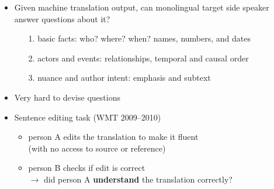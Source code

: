 \documentclass[landscape]{slides}
\begin{document}
\vspace{10mm}
\begin{itemize}
\item Given machine translation output, can monolingual target side speaker answer questions about it?
\begin{itemize}
\item[1.] basic facts: who? where? when?  names, numbers, and dates
\item[2.] actors and events: relationships, temporal and causal order
\item[3.] nuance and author intent: emphasis and subtext
\end{itemize}
\item Very hard to devise questions
\item Sentence editing task (WMT 2009--2010)
\begin{itemize}
\item person A edits the translation to make it fluent\\ (with no access to source or reference)
\item person B checks if edit is correct\\
$\rightarrow$ did person A {\bf understand} the translation correctly?
\end{itemize}
\end{itemize}

\end{document}
